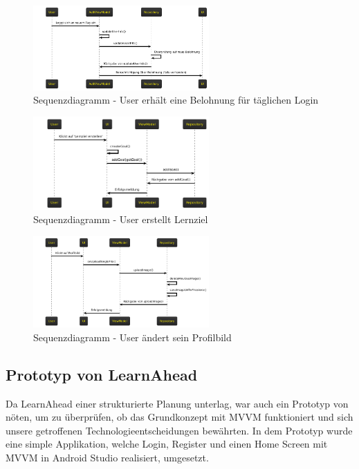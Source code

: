 \begin{figure}[h]
    \centering
    \includegraphics[width=0.6\textwidth]{images/diagramme/sequenzdiagramme/user_login_belohnung.png}
    \caption{Sequenzdiagramm - User erhält eine Belohnung für täglichen Login}
    \label{fig:sequenz_user_login_belohnung}
\end{figure} 
\begin{figure}[h]
    \centering
    \includegraphics[width=0.6\textwidth]{images/diagramme/sequenzdiagramme/user_erstellt_lernziel.png}
    \caption{Sequenzdiagramm - User erstellt Lernziel}
    \label{fig:sequenz_user_erstellt_lernziel}
\end{figure} 
\begin{figure}[h]
    \centering
    \includegraphics[width=0.6\textwidth]{images/diagramme/sequenzdiagramme/user_aendert_profilbild.png}
    \caption{Sequenzdiagramm - User ändert sein Profilbild}
    \label{fig:sequenz_user_aendert_profilbild}
\end{figure} 
\newpage
\subsection{Prototyp von LearnAhead}
Da LearnAhead einer strukturierte Planung unterlag, war auch ein Prototyp von nöten, um zu überprüfen, ob das Grundkonzept mit MVVM funktioniert und sich unsere getroffenen Technologieentscheidungen bewährten. \newline
In dem Prototyp wurde eine simple Applikation, welche Login, Register und einen Home Screen mit MVVM in Android Studio realisiert, umgesetzt. \newline